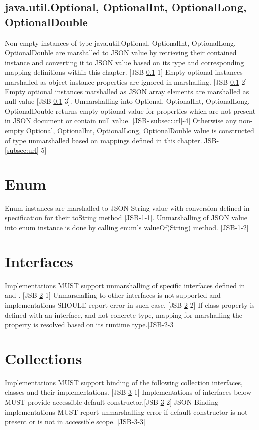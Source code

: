 \subsection{java.util.Optional, OptionalInt, OptionalLong, OptionalDouble}
\label{subsec:optional}
Non-empty instances of type java.util.Optional, OptionalInt, OptionalLong, OptionalDouble are marshalled to JSON value by retrieving their contained instance and converting it to JSON value based on its type and corresponding mapping definitions within this chapter. [JSB-\ref{subsec:optional}-1] Empty optional instances marshalled as object instance properties are ignored in marshalling. [JSB-\ref{subsec:optional}-2] Empty optional instances marshalled as JSON array elements are marshalled as null value [JSB-\ref{subsec:optional}-3]. Unmarshalling into Optional, OptionalInt, OptionalLong, OptionalDouble returns empty optional value for properties which are not present in JSON document or contain null value. [JSB-\ref{subsec:url}-4] Otherwise any non-empty Optional, OptionalInt, OptionalLong, OptionalDouble value is constructed of type unmarshalled based on mappings defined in this chapter.[JSB-\ref{subsec:url}-5]

\section{Enum}
\label{sec:enum}
Enum instances are marshalled to JSON String value with conversion defined in specification for their toString method [JSB-\ref{sec:enum}-1]. Unmarshalling of JSON value into enum instance is done by calling enum's valueOf(String) method. [JSB-\ref{sec:enum}-2]

\section{Interfaces}
\label{sec:interfaces}
Implementations MUST support unmarshalling of specific interfaces defined in  and . [JSB-\ref{sec:interfaces}-1] Unmarshalling to other interfaces is not supported and implementations SHOULD report error in such case. [JSB-\ref{sec:interfaces}-2] If class property is defined with an interface, and not concrete type, mapping for marshalling the property is resolved based on its runtime type.[JSB-\ref{sec:interfaces}-3]

\section{Collections}
\label{sec:collections}
Implementations MUST support binding of the following collection interfaces, classes and their implementations. [JSB-\ref{sec:collections}-1] Implementations of interfaces below MUST provide accessible default constructor.[JSB-\ref{sec:collections}-2] JSON Binding implementations MUST report unmarshalling error if default constructor is not present or is not in accessible scope. [JSB-\ref{sec:collections}-3]

